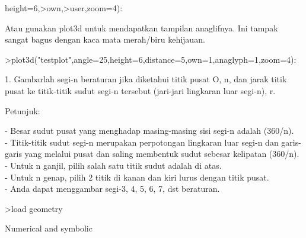 \documentclass[a4paper,10pt]{article}
\begin{document}
\begin{eulernotebook}
\begin{eulercomment}
\begin{eulercomment}
\begin{eulercomment}
\begin{eulercomment}
\begin{eulercomment}
\begin{eulercomment}
\begin{eulercomment}
\begin{eulercomment}
\begin{eulercomment}
\begin{eulercomment}
\begin{eulercomment}
\begin{eulercomment}
\begin{eulercomment}
\begin{eulercomment}
\begin{eulercomment}
\begin{eulercomment}
\begin{eulercomment}
\begin{eulercomment}
\begin{eulercomment}
\begin{eulercomment}
\begin{eulercomment}
\begin{eulercomment}
\begin{eulercomment}
\begin{eulercomment}
\begin{eulercomment}
\begin{eulercomment}
\begin{eulercomment}
\begin{eulercomment}
\begin{eulercomment}
\begin{eulercomment}
\begin{eulercomment}
\begin{eulercomment}
\begin{eulercomment}
\begin{eulercomment}
\begin{eulercomment}
\begin{eulercomment}
\begin{eulercomment}
\begin{eulercomment}
\begin{eulercomment}
\begin{eulercomment}
\begin{eulercomment}
\begin{eulercomment}
\begin{eulercomment}
\begin{eulercomment}
\begin{eulercomment}
\begin{eulercomment}
\begin{eulercomment}
\begin{eulercomment}
\begin{eulercomment}
\begin{eulercomment}
\begin{eulercomment}
\begin{eulercomment}
\begin{eulercomment}
\begin{eulercomment}
\begin{eulercomment}
\begin{eulercomment}
\begin{eulercomment}
\begin{eulercomment}
\begin{eulercomment}
\begin{eulercomment}
\begin{eulercomment}
\begin{eulercomment}
\begin{eulercomment}
\begin{eulercomment}
\begin{eulerprompt}
height=6,>own,>user,zoom=4):
\end{eulerprompt}
\begin{eulercomment}
Atau gunakan plot3d untuk mendapatkan tampilan anaglifnya. Ini tampak
sangat bagus dengan kaca mata merah/biru kehijauan.
\end{eulercomment}
\begin{eulerprompt}
>plot3d("testplot",angle=25,height=6,distance=5,own=1,anaglyph=1,zoom=4):
\end{eulerprompt}
\begin{eulercomment}
1. Gambarlah segi-n beraturan jika diketahui titik pusat O, n, dan
jarak titik pusat ke titik-titik sudut segi-n tersebut (jari-jari
lingkaran luar segi-n), r.

Petunjuk:

- Besar sudut pusat yang menghadap masing-masing sisi segi-n adalah
(360/n).\\
- Titik-titik sudut segi-n merupakan perpotongan lingkaran luar segi-n
dan garis-garis yang melalui pusat dan saling membentuk sudut sebesar
kelipatan (360/n).\\
- Untuk n ganjil, pilih salah satu titik sudut adalah di atas.\\
- Untuk n genap, pilih 2 titik di kanan dan kiri lurus dengan titik
pusat.\\
- Anda dapat menggambar segi-3, 4, 5, 6, 7, dst beraturan.
\end{eulercomment}
\begin{eulerprompt}
>load geometry
\end{eulerprompt}
\begin{euleroutput}
  Numerical and symbolic 
\end{euleroutput}
\end{eulercomment}
\end{eulercomment}
\end{eulercomment}
\end{eulercomment}
\end{eulercomment}
\end{eulercomment}
\end{eulercomment}
\end{eulercomment}
\end{eulercomment}
\end{eulercomment}
\end{eulercomment}
\end{eulercomment}
\end{eulercomment}
\end{eulercomment}
\end{eulercomment}
\end{eulercomment}
\end{eulercomment}
\end{eulercomment}
\end{eulercomment}
\end{eulercomment}
\end{eulercomment}
\end{eulercomment}
\end{eulercomment}
\end{eulercomment}
\end{eulercomment}
\end{eulercomment}
\end{eulercomment}
\end{eulercomment}
\end{eulercomment}
\end{eulercomment}
\end{eulercomment}
\end{eulercomment}
\end{eulercomment}
\end{eulercomment}
\end{eulercomment}
\end{eulercomment}
\end{eulercomment}
\end{eulercomment}
\end{eulercomment}
\end{eulercomment}
\end{eulercomment}
\end{eulercomment}
\end{eulercomment}
\end{eulercomment}
\end{eulercomment}
\end{eulercomment}
\end{eulercomment}
\end{eulercomment}
\end{eulercomment}
\end{eulercomment}
\end{eulercomment}
\end{eulercomment}
\end{eulercomment}
\end{eulercomment}
\end{eulercomment}
\end{eulercomment}
\end{eulercomment}
\end{eulercomment}
\end{eulercomment}
\end{eulercomment}
\end{eulercomment}
\end{eulercomment}
\end{eulercomment}
\end{eulercomment}
\end{eulernotebook}
\end{document}
